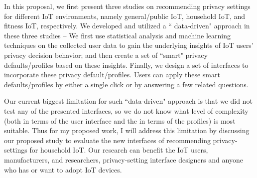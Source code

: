 In this proposal, we first present three studies on recommending privacy settings for different IoT environments, namely general/public IoT, household IoT, and fitness IoT, respectively. We developed and utilized a `` data-driven" approach in these three studies -- We first use statistical analysis and machine learning techniques on the collected user data to gain the underlying insights of IoT users' privacy decision behavior; and then create a set of ``smart" privacy defaults/profiles based on these insights. Finally, we design a set of interfaces to incorporate these privacy default/profiles. Users can apply these smart defaults/profiles by either a single click or by answering a few related questions.

Our current biggest limitation for such ``data-driven" approach is that we did not test any of the presented interfaces, so we do not know what level of complexity (both in terms of the user interface and the in terms of the profiles) is most suitable. Thus for my proposed work, I will address this limitation by discussing our proposed study to evaluate the new interfaces of recommending privacy-settings for household IoT. Our research can benefit the IoT users, manufacturers, and researchers, privacy-setting interface designers and anyone who has or want to adopt IoT devices.
